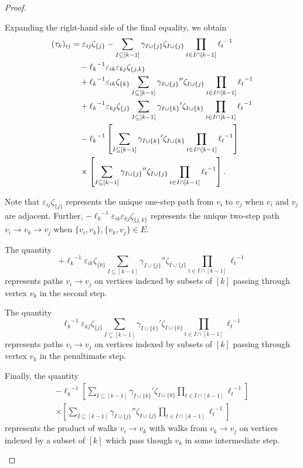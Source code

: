 \documentclass[10pt,a4paper]{amsart}
\begin{document}
\begin{proof}
\begin{description}
Expanding the right-hand side of the final equality, we obtain 
\begin{align*}
(\tau_k)_{ij}&=\varepsilon_{ij}\zeta_{\{j\}}-\sum_{I\subseteq [k-1]}\gamma_{I\cup\{j\}}\zeta_{I\cup\{j\}}\prod_{t\in I\cap[k-1]}{\ell_t}^{-1}\\
&\hskip10pt-{\ell_k}^{-1}\varepsilon_{ik}\varepsilon_{kj}\zeta_{\{j,k\}}\\
&\hskip10pt+{\ell_k}^{-1}\varepsilon_{ik}\zeta_{\{k\}}\sum_{I\subseteq [k-1]}{\gamma_{I\cup\{j\}}}''\zeta_{I\cup\{j\}}\prod_{t\in I\cap[k-1]}{\ell_t}^{-1}\\
&\hskip10pt+{\ell_k}^{-1}\varepsilon_{kj}\zeta_{\{j\}}\sum_{I\subseteq [k-1]}{\gamma_{I\cup\{k\}}}'\zeta_{I\cup\{k\}}\prod_{t\in I\cap[k-1]}{\ell_t}^{-1}\\
&\hskip10pt-{\ell_k}^{-1}\left[\sum_{I\subseteq [k-1]}{\gamma_{I\cup\{k\}}}'\zeta_{I\cup\{k\}}\prod_{t\in I\cap[k-1]}{\ell_t}^{-1}\right]\\
&\hskip10pt\times\left[\sum_{I\subseteq [k-1]}{\gamma_{I\cup\{j\}}}''\zeta_{I\cup\{j\}}\prod_{t\in I\cap[k-1]}{\ell_t}^{-1}\right].
\end{align*}

Note that $\varepsilon_{ij}\zeta_{\{j\}}$ represents the unique one-step path from $v_i$ to $v_j$ when $v_i$ and $v_j$ are adjacent.  Further, $-{\ell_k}^{-1}\varepsilon_{ik}\varepsilon_{kj}\zeta_{\{j,k\}}$ represents the unique two-step path $v_i\to v_k\to v_j$ when $\{v_i,v_k\}, \{v_k,v_j\}\in E$.  

The quantity \begin{equation*}
+{\ell_k}^{-1}\varepsilon_{ik}\zeta_{\{k\}}\sum_{I\subseteq [k-1]}{\gamma_{I\cup\{j\}}}''\zeta_{I\cup\{j\}}\prod_{t\in I\cap[k-1]}{\ell_t}^{-1}
\end{equation*}
represents paths $v_i\to v_j$ on vertices indexed by subsets of $[k]$ passing through vertex $v_k$ in the second step.

The quantity \begin{equation*}
{\ell_k}^{-1}\varepsilon_{kj}\zeta_{\{j\}}\sum_{I\subseteq [k-1]}{\gamma_{I\cup\{k\}}}'\zeta_{I\cup\{k\}}\prod_{t\in I\cap[k-1]}{\ell_t}^{-1}
\end{equation*}
represents paths $v_i\to v_j$ on vertices indexed by subsets of $[k]$ passing through vertex $v_k$ in the penultimate step.

Finally, the quantity 
\begin{align*}
-{\ell_k}^{-1}\left[\sum_{I\subseteq [k-1]}{\gamma_{I\cup\{k\}}}'\zeta_{I\cup\{k\}}\prod_{t\in I\cap[k-1]}{\ell_t}^{-1}\right]\\
 \times
\left[\sum_{I\subseteq [k-1]}{\gamma_{I\cup\{j\}}}''\zeta_{I\cup\{j\}}\prod_{t\in I\cap[k-1]}{\ell_t}^{-1}\right]
\end{align*}
represents the product of walks $v_i\to v_k$ with walks from $v_k\to v_j$ on vertices indexed by a subset of $[k]$ which pass though $v_k$ in some intermediate step.  




\end{description}
\end{proof}
\end{document}
